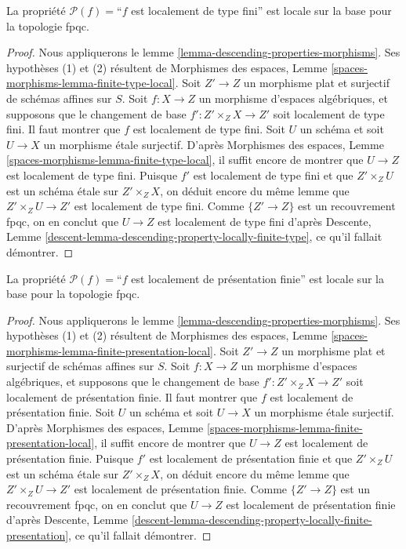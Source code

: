 \begin{lemma}
\label{lemma-descending-property-locally-finite-type}
La propriété $\mathcal{P}(f) =$``$f$ est localement de type fini''
est locale sur la base pour la topologie fpqc.
\end{lemma}

\begin{proof}
Nous appliquerons le
lemme \ref{lemma-descending-properties-morphisms}.
Ses hypothèses (1) et (2) résultent de
Morphismes des espaces,
Lemme \ref{spaces-morphisms-lemma-finite-type-local}.
Soit $Z' \to Z$ un morphisme plat et surjectif de schémas affines sur $S$.
Soit $f : X \to Z$ un morphisme d'espaces algébriques, et supposons
que le changement de base $f' : Z' \times_Z X \to Z'$ soit localement de type fini.
Il faut montrer que $f$ est localement de type fini. Soit $U$ un schéma
et soit $U \to X$ un morphisme étale surjectif. D'après
Morphismes des espaces,
Lemme \ref{spaces-morphisms-lemma-finite-type-local},
il suffit encore de montrer que $U \to Z$ est localement de type fini.
Puisque $f'$ est localement de type fini et que $Z' \times_Z U$ est un
schéma étale sur $Z' \times_Z X$, on déduit encore du même lemme que
$Z' \times_Z U \to Z'$ est localement de type fini.
Comme $\{Z' \to Z\}$ est un recouvrement fpqc, on en conclut que
$U \to Z$ est localement de type fini d'après
Descente, Lemme \ref{descent-lemma-descending-property-locally-finite-type},
ce qu'il fallait démontrer.
\end{proof}

\begin{lemma}
\label{lemma-descending-property-locally-finite-presentation}
La propriété $\mathcal{P}(f) =$``$f$ est localement de présentation finie''
est locale sur la base pour la topologie fpqc.
\end{lemma}

\begin{proof}
Nous appliquerons le
lemme \ref{lemma-descending-properties-morphisms}.
Ses hypothèses (1) et (2) résultent de
Morphismes des espaces,
Lemme \ref{spaces-morphisms-lemma-finite-presentation-local}.
Soit $Z' \to Z$ un morphisme plat et surjectif de schémas affines sur $S$.
Soit $f : X \to Z$ un morphisme d'espaces algébriques, et supposons
que le changement de base $f' : Z' \times_Z X \to Z'$ soit localement de
présentation finie.
Il faut montrer que $f$ est localement de présentation finie. Soit $U$ un schéma
et soit $U \to X$ un morphisme étale surjectif. D'après
Morphismes des espaces,
Lemme \ref{spaces-morphisms-lemma-finite-presentation-local},
il suffit encore de montrer que $U \to Z$ est localement de présentation finie.
Puisque $f'$ est localement de présentation finie et que $Z' \times_Z U$ est un
schéma étale sur $Z' \times_Z X$, on déduit encore du même lemme que
$Z' \times_Z U \to Z'$ est localement de présentation finie.
Comme $\{Z' \to Z\}$ est un recouvrement fpqc, on en conclut que
$U \to Z$ est localement de présentation finie d'après
Descente,
Lemme \ref{descent-lemma-descending-property-locally-finite-presentation},
ce qu'il fallait démontrer.
\end{proof}

